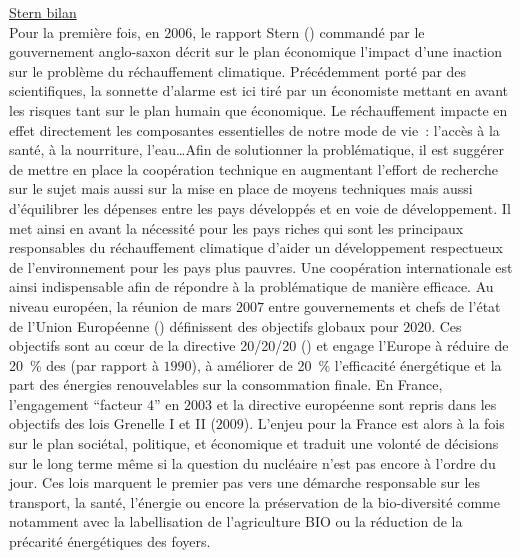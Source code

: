\href{http://www.automatesintelligents.com/echanges/2006/nov/rapportstern.html}{Stern bilan}\\
Pour la première fois, en $2006$, le rapport Stern () commandé par
le gouvernement anglo-saxon décrit sur le plan économique l’impact d’une inaction
sur le problème du réchauffement climatique. Précédemment porté par des scientifiques,
la sonnette d’alarme est ici tiré par un économiste mettant en avant les risques
tant sur le plan humain que économique. Le réchauffement impacte en effet directement
les composantes essentielles de notre mode de vie~: l’accès à la santé, à la nourriture,
l’eau\dots Afin de solutionner la problématique, il est suggérer de mettre en place
la coopération technique en augmentant l’effort de recherche sur le sujet mais aussi
sur la mise en place de moyens techniques mais aussi d’équilibrer les dépenses
entre les pays développés et en voie de développement. Il met ainsi en avant la nécessité
pour les pays riches qui sont les principaux responsables du réchauffement climatique
d’aider un développement respectueux de l’environnement pour les pays plus pauvres.
Une coopération internationale est ainsi indispensable afin de répondre à la problématique
de manière efficace.
Au niveau européen, la réunion de mars $2007$ entre gouvernements et chefs de l’état
de l’Union Européenne () définissent des objectifs globaux pour $2020$. Ces objectifs
sont au cœur de la directive 20/20/20 () et engage l’Europe à réduire
de \SI{20}{\percent} des  (par rapport à $1990$), à améliorer de \SI{20}{\percent} l’efficacité énergétique et
la part des énergies renouvelables sur la consommation finale.
En France, l’engagement \enquote{facteur 4} en $2003$ et la directive européenne sont
repris dans les objectifs des lois Grenelle I et II ($2009$). L’enjeu pour la France est
alors à la fois sur le plan sociétal, politique, et économique et traduit une volonté de décisions sur le
long terme même si la question du nucléaire n’est pas encore à l’ordre du jour. Ces lois
marquent le premier pas vers une démarche responsable sur les transport, la santé, l’énergie ou encore la préservation
de la bio-diversité comme notamment avec la labellisation de l’agriculture BIO ou
la réduction de la précarité énergétiques des foyers.

